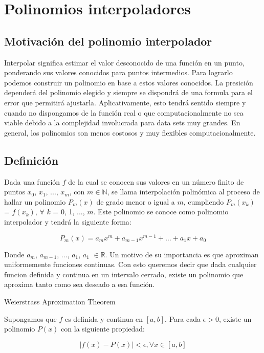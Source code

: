 \section{Polinomios interpoladores}

\subsection{Motivación del polinomio interpolador}

Interpolar significa estimar el valor desconocido de una función en un punto,
ponderando sus valores conocidos para puntos intermedios. Para lograrlo podemos construir un polinomio en base a estos valores conocidos. La presición dependerá del polinomio elegido y siempre se dispondrá de una formula para el error que permitirá ajustarla.
Aplicativamente, esto tendrá sentido siempre y cuando no dispongamos de la función real o que computacionalmente no sea viable debido a la complejidad involucrada para data sets muy grandes. En general, los polinomios son menos costosos y muy flexibles computacionalmente.

\subsection{Definición}

Dada una función $f$ de la cual se conocen sus valores en un número finito de puntos $x_0$, $x_1$, ..., $x_m$, con $m \in \mathbb{N}$, se llama interpolación polinómica al proceso de hallar un polinomio $P_m(x)$ de grado menor o igual a $m$, cumpliendo $P_m(x_k)$ = $f(x_k)$,  $\forall$ $k$ = 0, 1, ..., $m$.
Este polinomio se conoce como polinomio interpolador y tendrá la siguiente forma:

\begin{equation}
	 P_m(x) = a_mx^m + a_{m-1}x^{m-1} + \dots + a_1x + a_0
\end{equation}

Donde $a_m$, $a_{m-1}$, $\dots$, $a_1$, $a_1$ $\in \mathbb{R}$.
Un motivo de su importancia es que aproximan uniformemente funciones continuas. 
Con esto queremos decir que dada cualquier funcion definida y continua en un intervalo cerrado, existe un polinomio que aproxima tanto como sea deseado a esa función.

\begin{theorem}
	\item Weierstrass Aproximation Theorem
	\item Supongamos que $f$ es definida y continua en $[a, b]$. Para cada $\epsilon > 0$, existe un polinomio $P(x)$ con la siguiente propiedad:	
\end{theorem}
\begin{equation}
	 |f(x) - P(x)| < \epsilon, \forall x \in [a, b]
\end{equation}

